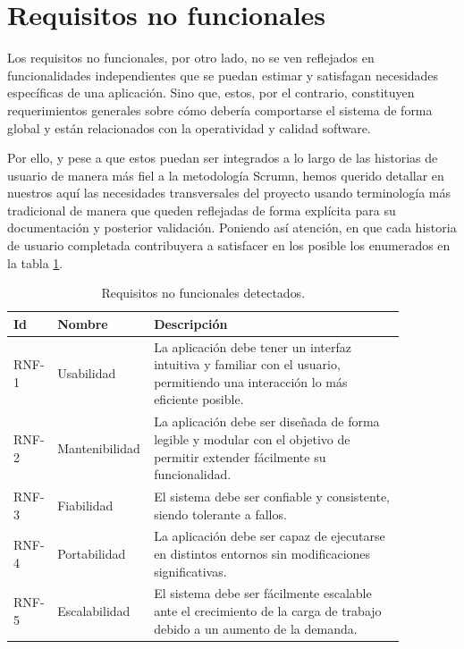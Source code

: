 \section{Requisitos no funcionales}
Los requisitos no funcionales, por otro lado, no se ven reflejados en funcionalidades independientes que se puedan estimar y satisfagan necesidades específicas de una aplicación. Sino que, estos, por el contrario, constituyen requerimientos generales sobre cómo debería comportarse el sistema de forma global y están relacionados con la operatividad y calidad software.

Por ello, y pese a que estos puedan ser integrados a lo largo de las historias de usuario de manera más fiel a la metodología Scrumn, hemos querido detallar en nuestros aquí las necesidades transversales del proyecto usando terminología más tradicional de manera que queden reflejadas de forma explícita para su documentación y posterior validación. Poniendo así atención, en que cada historia de usuario completada contribuyera a satisfacer en los posible los enumerados en la tabla \ref{tab:rnf}.


\begin{table}[H]
{
    \setlength{\tabcolsep}{0.4\tabcolsep}
    \begin{tabular}{|p{0.07\linewidth} | p{0.17\linewidth}| p{0.63\linewidth}|}
    \hline
    \rowcolor{udcpink!25}
    Id & Nombre & Descripción\\ \hline
    RNF-1 & Usabilidad & La aplicación debe tener un interfaz intuitiva y familiar con el usuario, permitiendo una interacción lo más eficiente posible.\\ \hline
    RNF-2 & Mantenibilidad & La aplicación debe ser diseñada de forma legible y modular con el objetivo de permitir extender fácilmente su funcionalidad.\\ \hline
    RNF-3 & Fiabilidad & El sistema debe ser confiable y consistente, siendo tolerante a fallos. \\ \hline
    RNF-4 & Portabilidad & La aplicación debe ser capaz de ejecutarse en distintos entornos sin modificaciones significativas.\\ \hline
    RNF-5 & Escalabilidad & El sistema debe ser fácilmente escalable ante el crecimiento de la carga de trabajo debido a un aumento de la demanda.\\ \hline
    \end{tabular}%
}
    \caption{Requisitos no funcionales detectados.}
\label{tab:rnf}
\end{table}

